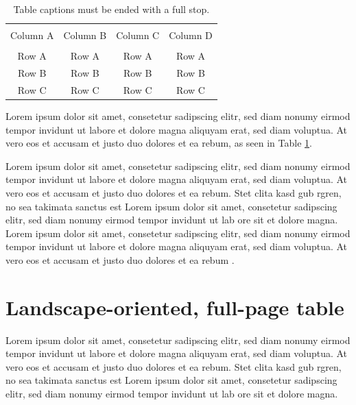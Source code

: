 \begin{table}[h]
	{\setlength{\tabcolsep}{14pt}
		\caption{Table captions must be ended with a full stop.}
		\begin{center}
			\vspace{-6mm}
			\begin{tabular}{cccc}
				\hline \\[-2.45ex] \hline \\[-2.1ex]
				Column A & Column B & Column C & Column D \\
				\hline \\[-1.8ex]
				Row A & Row A & Row A & Row A \\
				Row B & Row B & Row B & Row B \\
				Row C & Row C & Row C & Row C \\
				\hline
			\end{tabular}
			\vspace{-6mm}
		\end{center}
		\label{Table2.2}}
\end{table}

Lorem ipsum dolor sit amet, consetetur sadipscing elitr, sed diam nonumy eirmod tempor invidunt ut labore et dolore magna aliquyam erat, sed diam voluptua. At vero eos et accusam et justo duo dolores et ea rebum, as seen in Table \ref{Table2.2}. 

Lorem ipsum dolor sit amet, consetetur sadipscing elitr, sed diam nonumy eirmod tempor invidunt ut labore et dolore magna aliquyam erat, sed diam voluptua. At vero eos et accusam et justo duo dolores et ea rebum. Stet clita kasd gub rgren, no sea takimata sanctus est Lorem ipsum dolor sit amet, consetetur sadipscing elitr, sed diam nonumy eirmod tempor invidunt ut lab ore sit et dolore magna. Lorem ipsum dolor sit amet, consetetur sadipscing elitr, sed diam nonumy eirmod tempor invidunt ut labore et dolore magna aliquyam erat, sed diam voluptua. At vero eos et accusam et justo duo dolores et ea rebum \cite{Roberts_Jackson_1991}. 

\section{Landscape-oriented, full-page table}

Lorem ipsum dolor sit amet, consetetur sadipscing elitr, sed diam nonumy eirmod tempor invidunt ut labore et dolore magna aliquyam erat, sed diam voluptua. At vero eos et accusam et justo duo dolores et ea rebum. Stet clita kasd gub rgren, no sea takimata sanctus est Lorem ipsum dolor sit amet, consetetur sadipscing elitr, sed diam nonumy eirmod tempor invidunt ut lab ore sit et dolore magna.

